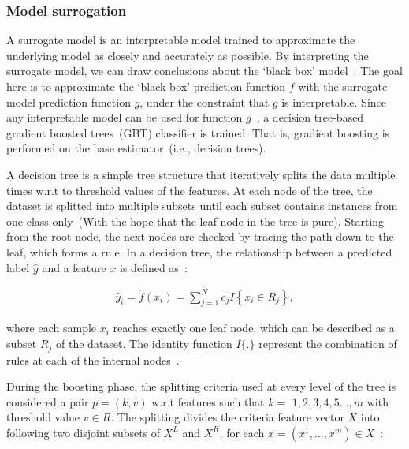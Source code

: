 \subsubsection{Model surrogation}
A surrogate model is an interpretable model trained to approximate the underlying model as closely and accurately as possible. By interpreting the surrogate model, we can draw conclusions about the `black box' model~\cite{molnar2019interpretable}. The goal here is to approximate the `black-box' prediction function $f$ with the surrogate model prediction function $g$, under the constraint that $g$ is interpretable. Since any interpretable model can be used for function $g$~\cite{molnar2019interpretable}, a decision tree-based gradient boosted trees~(GBT) classifier is trained. That is, gradient boosting is performed on the base estimator~(i.e., decision trees). 

\hspace*{3.5mm} A decision tree is a simple tree structure that iteratively splits the data multiple times w.r.t to threshold values of the features. At each node of the tree, the dataset is splitted into multiple subsets until each subset contains instances from one class only~(With the hope that the leaf node in the tree is pure). Starting from the root node, the next nodes are checked by tracing the path down to the leaf, which forms a rule. In a decision tree, the relationship between a predicted label $\hat{y}$ and a feature $x$ is defined as~\cite{di2019surrogate}: 

\vspace{-2mm}
\begin{align}
    \hat{y}_{i}=\hat{f}\left(x_{i}\right)=\sum_{j=1}^{N} c_{j} I\left\{x_{i} \in R_{j}\right\},
\end{align}

\hspace*{3.5mm} where each sample $x_{i}$ reaches exactly one leaf node, which can be described as a subset $R_{j}$ of the dataset. The identity function $I\{.\}$ represent the combination of rules at each of the internal nodes~\cite{di2019surrogate}.

During the boosting phase, the splitting criteria used at every level of the tree is considered a pair $p=(k, v)$ w.r.t features such that $k=$ $1,2,3,4,5 \ldots, m$ with threshold value $v \in R$. The splitting divides the criteria feature vector $X$ into following two disjoint subsets of $X^{L}$ and $X^{R}$, for each $x=\left(x^{1}, \ldots, x^{m}\right) \in X$~\cite{al2021cdrgi}:

